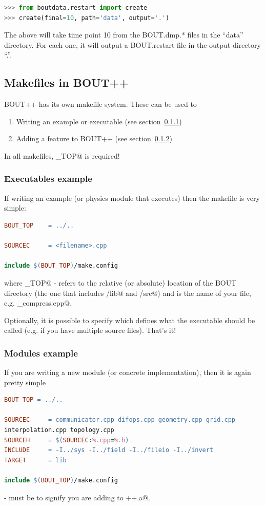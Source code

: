 \documentclass[12pt]{article}
\begin{document}
\begin{lstlisting}[language=python,numbers=none]
>>> from boutdata.restart import create
>>> create(final=10, path='data', output='.')
\end{lstlisting}
The above will take time point 10 from the BOUT.dmp.* files in the ``data'' directory.
For each one, it will output a BOUT.restart file in the output directory ``.''.


\subsection{Makefiles in BOUT++}
BOUT++ has its own makefile system. These can be used to
%
\begin{enumerate}
 \item Writing an example or executable (see section~\ref{sec:executables})
 \item Adding a feature to BOUT++ (see section~\ref{sec:modules})
\end{enumerate}
%
In all makefiles, \verb@BOUT_TOP@ is required!

\subsubsection{Executables example}
\label{sec:executables}
If writing an example (or physics module that executes) then the makefile is 
very simple:
%
\begin{lstlisting}[language=make,numbers=none]
BOUT_TOP	= ../..

SOURCEC		= <filename>.cpp

include $(BOUT_TOP)/make.config 
\end{lstlisting}
%
where \verb@BOUT_TOP@ - refers to the relative (or absolute) location of the 
BOUT directory (the one that includes \verb@/lib@ and \verb@/src@) and 
\verb@SOURCEC@  is the name of your file, e.g. \verb@gas_compress.cpp@.

Optionally, it is possible to specify \verb@TARGET@ which defines what the 
executable should be called (e.g. if you have multiple source files). That's it!

\subsubsection{Modules example}
\label{sec:modules}
If you are writing a new module (or concrete implementation), then it is again 
pretty simple
%
\begin{lstlisting}[language=make,numbers=none]
BOUT_TOP = ../..

SOURCEC		= communicator.cpp difops.cpp geometry.cpp grid.cpp	
interpolation.cpp topology.cpp
SOURCEH		= $(SOURCEC:%.cpp=%.h)
INCLUDE		= -I../sys -I../field -I../fileio -I../invert
TARGET		= lib

include $(BOUT_TOP)/make.config
\end{lstlisting}
%
\verb@TARGET@ - must be \verb@lib@ to signify you are adding to 
\verb@libbout++.a@.
\end{document}
